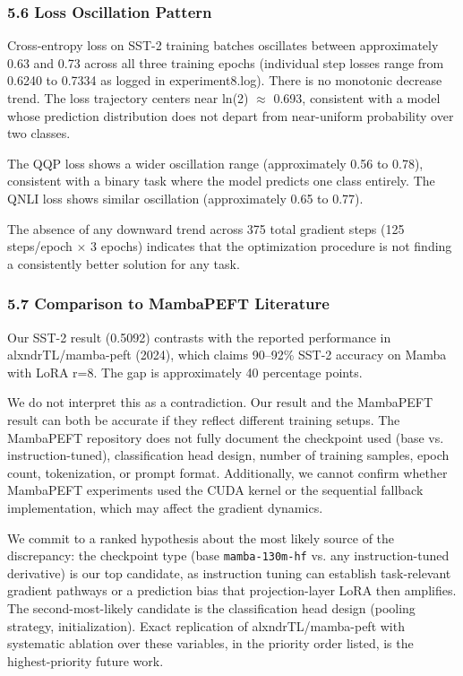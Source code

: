 \subsubsection{5.6 Loss Oscillation Pattern}

Cross-entropy loss on SST-2 training batches oscillates between approximately 0.63 and 0.73 across all three training epochs (individual step losses range from 0.6240 to 0.7334 as logged in experiment8.log). There is no monotonic decrease trend. The loss trajectory centers near ln(2) $\approx$ 0.693, consistent with a model whose prediction distribution does not depart from near-uniform probability over two classes.

The QQP loss shows a wider oscillation range (approximately 0.56 to 0.78), consistent with a binary task where the model predicts one class entirely. The QNLI loss shows similar oscillation (approximately 0.65 to 0.77).

The absence of any downward trend across 375 total gradient steps (125 steps/epoch $\times$ 3 epochs) indicates that the optimization procedure is not finding a consistently better solution for any task.

\subsubsection{5.7 Comparison to MambaPEFT Literature}

Our SST-2 result (0.5092) contrasts with the reported performance in alxndrTL/mamba-peft (2024), which claims 90--92\% SST-2 accuracy on Mamba with LoRA r=8. The gap is approximately 40 percentage points.

We do not interpret this as a contradiction. Our result and the MambaPEFT result can both be accurate if they reflect different training setups. The MambaPEFT repository does not fully document the checkpoint used (base vs. instruction-tuned), classification head design, number of training samples, epoch count, tokenization, or prompt format. Additionally, we cannot confirm whether MambaPEFT experiments used the CUDA kernel or the sequential fallback implementation, which may affect the gradient dynamics.

We commit to a ranked hypothesis about the most likely source of the discrepancy: the checkpoint type (base \texttt{mamba-130m-hf} vs. any instruction-tuned derivative) is our top candidate, as instruction tuning can establish task-relevant gradient pathways or a prediction bias that projection-layer LoRA then amplifies. The second-most-likely candidate is the classification head design (pooling strategy, initialization). Exact replication of alxndrTL/mamba-peft with systematic ablation over these variables, in the priority order listed, is the highest-priority future work.

